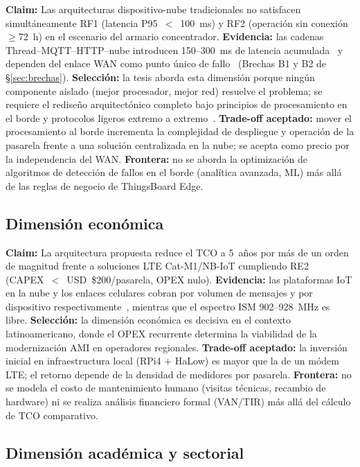 \textbf{Claim:} Las arquitecturas dispositivo-nube tradicionales no satisfacen simultáneamente RF1 (latencia P95~$<$~100~ms) y RF2 (operación sin conexión $\geq$72~h) en el escenario del armario concentrador.
\textbf{Evidencia:} las cadenas Thread--MQTT--HTTP--nube introducen 150--300~ms de latencia acumulada~\cite{laghariInternetThingsIoT2024} y dependen del enlace WAN como punto único de fallo~\cite{NISTFramework2022} (Brechas B1 y B2 de §\ref{sec:brechas}).
\textbf{Selección:} la tesis aborda esta dimensión porque ningún componente aislado (mejor procesador, mejor red) resuelve el problema; se requiere el rediseño arquitectónico completo bajo principios de procesamiento en el borde y protocolos ligeros extremo a extremo~\cite{satyanarayananEmergenceEdgeComputing2017,bonomiFogComputingItsRole2012}.
\textbf{Trade-off aceptado:} mover el procesamiento al borde incrementa la complejidad de despliegue y operación de la pasarela frente a una solución centralizada en la nube; se acepta como precio por la independencia del WAN.
\textbf{Frontera:} no se aborda la optimización de algoritmos de detección de fallos en el borde (analítica avanzada, ML) más allá de las reglas de negocio de ThingsBoard Edge.

\subsection{Dimensión económica}

\textbf{Claim:} La arquitectura propuesta reduce el TCO a 5~años por más de un orden de magnitud frente a soluciones LTE Cat-M1/NB-IoT cumpliendo RE2 (CAPEX~$<$~USD~\$200/pasarela, OPEX nulo).
\textbf{Evidencia:} las plataformas IoT en la nube y los enlaces celulares cobran por volumen de mensajes y por dispositivo respectivamente~\cite{alsafranChallengesImplementingIoT2025,hossainComparativeStudyIoTCommunication2018}, mientras que el espectro ISM 902--928~MHz es libre.
\textbf{Selección:} la dimensión económica es decisiva en el contexto latinoamericano, donde el OPEX recurrente determina la viabilidad de la modernización AMI en operadores regionales.
\textbf{Trade-off aceptado:} la inversión inicial en infraestructura local (RPi4 + HaLow) es mayor que la de un módem LTE; el retorno depende de la densidad de medidores por pasarela.
\textbf{Frontera:} no se modela el costo de mantenimiento humano (visitas técnicas, recambio de hardware) ni se realiza análisis financiero formal (VAN/TIR) más allá del cálculo de TCO comparativo.

\subsection{Dimensión académica y sectorial}


